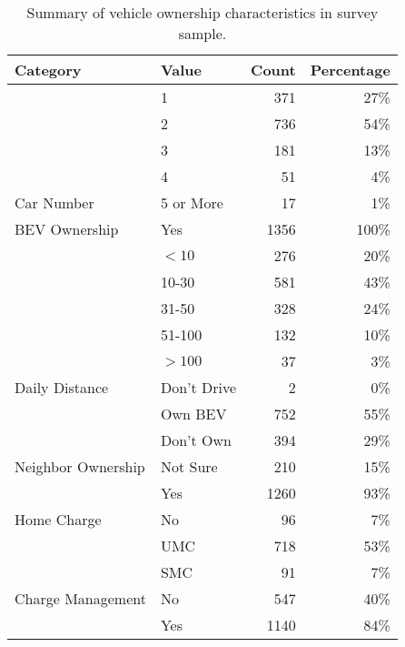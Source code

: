 \begin{table}[H]
\centering
\begin{threeparttable}
\caption{Summary of vehicle ownership characteristics in survey sample.}
\centering
\begin{tabular}[t]{llrr}
\toprule
\textbf{Category} & \textbf{Value} & \textbf{Count} & \textbf{Percentage}\\
\midrule
 & 1 & 371 & 27\%\\

 & 2 & 736 & 54\%\\

 & 3 & 181 & 13\%\\

 & 4 & 51 & 4\%\\

\multirow{-5}{*}{\raggedright\arraybackslash Car Number} & 5 or More & 17 & 1\%\\
\cmidrule(lr){1-4} 
\multirow{-1}{*}{\raggedright\arraybackslash BEV Ownership} & Yes & 1356 & 100\%\\
\cmidrule(lr){1-4}
 & $<10$ & 276 & 20\%\\

 & 10-30 & 581 & 43\%\\

 & 31-50 & 328 & 24\%\\

 & 51-100 & 132 & 10\%\\

 & $>100$ & 37 & 3\%\\

\multirow{-6}{*}{\raggedright\arraybackslash Daily Distance} & Don't Drive & 2 & 0\%\\
\cmidrule(lr){1-4}
 & Own BEV & 752 & 55\%\\

 & Don't Own & 394 & 29\%\\

\multirow{-3}{*}{\raggedright\arraybackslash Neighbor Ownership} & Not Sure & 210 & 15\%\\
\cmidrule(lr){1-4}
 & Yes & 1260 & 93\%\\

\multirow{-2}{*}{\raggedright\arraybackslash Home Charge} & No & 96 & 7\%\\
\cmidrule(lr){1-4}
 & UMC & 718 & 53\%\\

 & SMC & 91 & 7\%\\

\multirow{-3}{*}{\raggedright\arraybackslash Charge Management} & No & 547 & 40\%\\
\cmidrule(lr){1-4}
 & Yes & 1140 & 84\%\\


\end{tabular}
\end{threeparttable}
\end{table}
